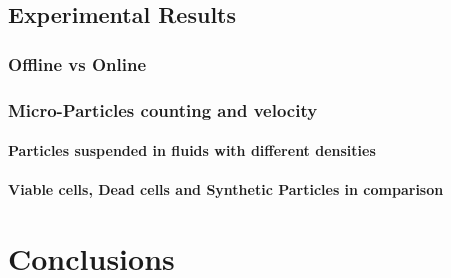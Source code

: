 \documentclass[journal]{IEEEtran}
\theoremstyle{definition}
\theoremstyle{remark}
\begin{document}
\subsection{Experimental Results}

\subsubsection{Offline vs Online}

\subsubsection{Micro-Particles counting and velocity}

\paragraph{Particles suspended in fluids with different densities}

\paragraph{Viable cells, Dead cells and Synthetic Particles in comparison}

\section{Conclusions}



%
\end{document}
